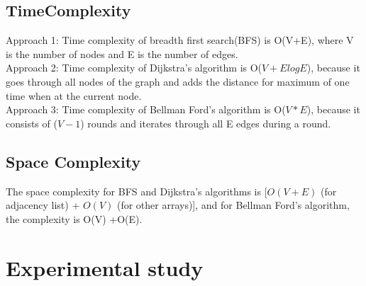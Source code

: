 \documentclass[conference]{IEEEtran}
\begin{document}
\subsection{\textbf{TimeComplexity}}
Approach  1: Time  complexity  of  breadth  first  search(BFS) is O(V+E),  where V is  the  number  of  nodes  and E is  the number of edges.\\
Approach  2: Time  complexity  of  Dijkstra’s  algorithm  is O($V+E logE$), because it goes through all nodes of  the  graph  and adds the distance for maximum of one time when at the current node.\\
Approach  3: Time  complexity  of  Bellman Ford's algorithm  is O($V*E$),  because  it consists  of ($V−1$) rounds  and iterates through all E edges during a round.

\subsection{\textbf{Space Complexity}} 
The  space  complexity  for  BFS and Dijkstra’s algorithms  is [$O(V+E)$ (for  adjacency  list)  + $O(V)$ (for  other  arrays)],  and  for Bellman Ford's  algorithm,  the complexity is O(V) +O(E).

\section{Experimental study}



\end{document}
